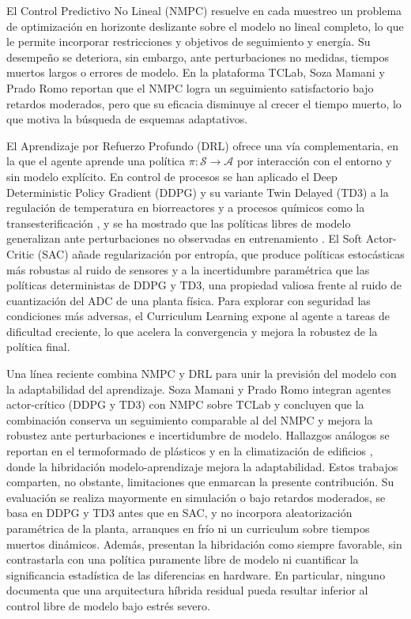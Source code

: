 \documentclass[processes,article,submit,moreauthors,pdftex]{Definitions/mdpi}
\begin{document}
El Control Predictivo No Lineal (NMPC) \cite{Rawlings2017,Mayne2014} resuelve
en cada muestreo un problema de optimización en horizonte deslizante sobre
el modelo no lineal completo, lo que le permite incorporar restricciones y
objetivos de seguimiento y energía. Su desempeño se deteriora, sin embargo,
ante perturbaciones no medidas, tiempos muertos largos o errores de modelo.
En la plataforma TCLab, Soza Mamani y Prado Romo \cite{SozaMamani2025}
reportan que el NMPC logra un seguimiento satisfactorio bajo retardos
moderados, pero que su eficacia disminuye al crecer el tiempo muerto, lo que
motiva la búsqueda de esquemas adaptativos.

El Aprendizaje por Refuerzo Profundo (DRL) \cite{Sutton2018,Mnih2015} ofrece
una vía complementaria, en la que el agente aprende una política
$\pi:\mathcal{S}\to\mathcal{A}$ por interacción con el entorno y sin modelo
explícito. En control de procesos se han aplicado el Deep Deterministic
Policy Gradient (DDPG) \cite{Lillicrap2016} y su variante Twin Delayed (TD3)
\cite{Fujimoto2018} a la regulación de temperatura en biorreactores
\cite{Rajasekhar2023} y a procesos químicos como la transesterificación
\cite{Joshi2021}, y se ha mostrado que las políticas libres de modelo
generalizan ante perturbaciones no observadas en entrenamiento
\cite{Spielberg2019,Dogru2022}. El Soft Actor-Critic (SAC) \cite{Haarnoja2018}
añade regularización por entropía, que produce políticas estocásticas más
robustas al ruido de sensores y a la incertidumbre paramétrica que las
políticas deterministas de DDPG y TD3, una propiedad valiosa frente al ruido
de cuantización del ADC de una planta física. Para explorar con seguridad las
condiciones más adversas, el Curriculum Learning \cite{Bengio2009,Narvekar2020}
expone al agente a tareas de dificultad creciente, lo que acelera la
convergencia y mejora la robustez de la política final.

Una línea reciente combina NMPC y DRL para unir la previsión del modelo con
la adaptabilidad del aprendizaje. Soza Mamani y Prado Romo \cite{SozaMamani2025}
integran agentes actor-crítico (DDPG y TD3) con NMPC sobre TCLab y concluyen
que la combinación conserva un seguimiento comparable al del NMPC y mejora la
robustez ante perturbaciones e incertidumbre de modelo. Hallazgos análogos se
reportan en el termoformado de plásticos \cite{Hosseinionari2024} y en la
climatización de edificios \cite{Chen2022}, donde la hibridación
modelo-aprendizaje mejora la adaptabilidad. Estos trabajos comparten, no
obstante, limitaciones que enmarcan la presente contribución. Su evaluación se
realiza mayormente en simulación o bajo retardos moderados, se basa en DDPG y
TD3 antes que en SAC, y no incorpora aleatorización paramétrica de la planta,
arranques en frío ni un curriculum sobre tiempos muertos dinámicos. Además,
presentan la hibridación como siempre favorable, sin contrastarla con
una política puramente libre de modelo ni cuantificar la significancia
estadística de las diferencias en hardware. En particular, ninguno documenta
que una arquitectura híbrida residual pueda resultar inferior al control libre
de modelo bajo estrés severo.
\end{document}
